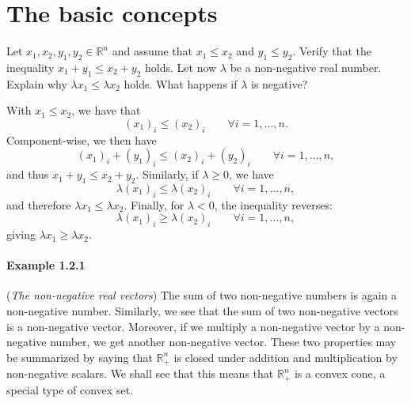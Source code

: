 \section{The basic concepts}

\begin{exercise}
  Let \( x_1, x_2, y_1, y_2 \in \mathbb{R}^n \) and assume that $x_1 \leq x_2$ and $y_1 \leq y_2$.
  Verify that the inequality $x_1 + y_1 \leq x_2 + y_2$ holds.
  Let now $\lambda$ be a non-negative real number.
  Explain why $\lambda x_1 \leq \lambda x_2$ holds.
  What happens if $\lambda$ is negative?
\end{exercise}

\begin{solution}
  With $x_1 \leq x_2$, we have that
  \begin{equation}
    (x_1)_i \leq (x_2)_i \qquad \forall i = 1, \ldots, n.
  \end{equation}
  Component-wise, we then have
  \begin{equation}
    (x_1)_i + (y_1)_i \leq (x_2)_i + (y_2)_i \qquad \forall i = 1, \ldots, n,
  \end{equation}
  and thus $x_1 + y_1 \leq x_2 + y_2$.
  Similarly, if $\lambda \geq 0$, we have
  \begin{equation}
    \lambda (x_1)_i \leq \lambda (x_2)_i \qquad \forall i = 1, \ldots, n,
  \end{equation}
  and therefore $\lambda x_1 \leq \lambda x_2$.
  Finally, for $\lambda < 0$, the inequality reverses:
  \begin{equation}
    \lambda (x_1)_i \geq \lambda (x_2)_i \qquad \forall i = 1, \ldots, n,
  \end{equation}
  giving $\lambda x_1 \geq \lambda x_2$.
\end{solution}

\paragraph{Example 1.2.1}
(\emph{The non-negative real vectors})
The sum of two non-negative numbers is again a non-negative number.
Similarly, we see that the sum of two non-negative vectors is a non-negative vector.
Moreover, if we multiply a non-negative vector by a non-negative number, we get another non-negative vector.
These two properties may be summarized by saying that $\mathbb{R}^n_+$ is closed under addition and multiplication by non-negative scalars.
We shall see that this means that $\mathbb{R}^n_+$ is a convex cone, a special type of convex set.


